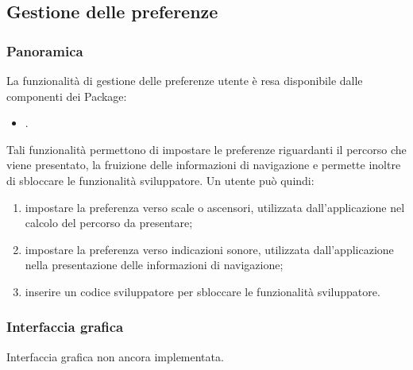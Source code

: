 \documentclass[../Funzionalita.tex]{subfiles}
\begin{document}
\subsection{Gestione delle preferenze}
\label{subsec:GestionePreferenze}

		\subsubsection{Panoramica}
			La funzionalità di gestione delle preferenze utente è resa disponibile dalle componenti dei Package:
			\begin{itemize}
				\item \usersetting.
			\end{itemize}
			Tali funzionalità permettono di impostare le preferenze riguardanti il percorso che viene presentato, la fruizione delle informazioni di navigazione e permette inoltre di sbloccare le funzionalità sviluppatore.
			Un utente può quindi:
			\begin{enumerate}
				\item impostare la preferenza verso scale o ascensori, utilizzata dall'applicazione nel calcolo del percorso da presentare;
				\item impostare la preferenza verso indicazioni sonore, utilizzata dall'applicazione nella presentazione delle informazioni di navigazione;
				\item inserire un codice sviluppatore per sbloccare le funzionalità sviluppatore.
			\end{enumerate}
			
		\newpage
		\subsubsection{Interfaccia grafica}
			Interfaccia grafica non ancora implementata.
			
				
				
\end{document}
